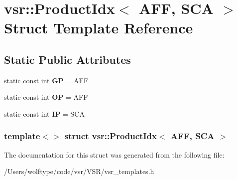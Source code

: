 \hypertarget{structvsr_1_1_product_idx_3_01_a_f_f_00_01_s_c_a_01_4}{\section{vsr\-:\-:Product\-Idx$<$ A\-F\-F, S\-C\-A $>$ Struct Template Reference}
\label{structvsr_1_1_product_idx_3_01_a_f_f_00_01_s_c_a_01_4}
}
\subsection*{Static Public Attributes}
\begin{DoxyCompactItemize}
\item 
\hypertarget{structvsr_1_1_product_idx_3_01_a_f_f_00_01_s_c_a_01_4_ac909c9f89aefaf041cef9e2729e391ba}{static const int {\bfseries G\-P} = A\-F\-F}\label{structvsr_1_1_product_idx_3_01_a_f_f_00_01_s_c_a_01_4_ac909c9f89aefaf041cef9e2729e391ba}

\item 
\hypertarget{structvsr_1_1_product_idx_3_01_a_f_f_00_01_s_c_a_01_4_ae99a383825ff774d865e99ea2523511e}{static const int {\bfseries O\-P} = A\-F\-F}\label{structvsr_1_1_product_idx_3_01_a_f_f_00_01_s_c_a_01_4_ae99a383825ff774d865e99ea2523511e}

\item 
\hypertarget{structvsr_1_1_product_idx_3_01_a_f_f_00_01_s_c_a_01_4_a753682a46e9113c2b0bd5e362ca909b3}{static const int {\bfseries I\-P} = S\-C\-A}\label{structvsr_1_1_product_idx_3_01_a_f_f_00_01_s_c_a_01_4_a753682a46e9113c2b0bd5e362ca909b3}

\end{DoxyCompactItemize}
\subsubsection*{template$<$$>$ struct vsr\-::\-Product\-Idx$<$ A\-F\-F, S\-C\-A $>$}



The documentation for this struct was generated from the following file\-:\begin{DoxyCompactItemize}
\item 
/\-Users/wolftype/code/vsr/\-V\-S\-R/vsr\-\_\-templates.\-h\end{DoxyCompactItemize}

